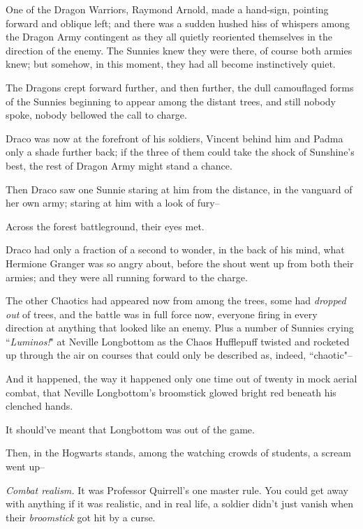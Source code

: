\later

One of the Dragon Warriors, Raymond Arnold, made a hand-sign, pointing forward and oblique left; and there was a sudden hushed hiss of whispers among the Dragon Army contingent as they all quietly reoriented themselves in the direction of the enemy. The Sunnies knew they were there, of course both armies knew; but somehow, in this moment, they had all become instinctively quiet.

The Dragons crept forward further, and then further, the dull camouflaged forms of the Sunnies beginning to appear among the distant trees, and still nobody spoke, nobody bellowed the call to charge.

Draco was now at the forefront of his soldiers, Vincent behind him and Padma only a shade further back; if the three of them could take the shock of Sunshine's best, the rest of Dragon Army might stand a chance.

Then Draco saw one Sunnie staring at him from the distance, in the vanguard of her own army; staring at him with a look of fury\---

Across the forest battleground, their eyes met.

Draco had only a fraction of a second to wonder, in the back of his mind, what Hermione Granger was so angry about, before the shout went up from both their armies; and they were all running forward to the charge.

\later

The other Chaotics had appeared now from among the trees, some had \emph{dropped out} of trees, and the battle was in full force now, everyone firing in every direction at anything that looked like an enemy. Plus a number of Sunnies crying ``\emph{Luminos!}" at Neville Longbottom as the Chaos Hufflepuff twisted and rocketed up through the air on courses that could only be described as, indeed, ``chaotic"\---

And it happened, the way it happened only one time out of twenty in mock aerial combat, that Neville Longbottom's broomstick glowed bright red beneath his clenched hands.

It should've meant that Longbottom was out of the game.

Then, in the Hogwarts stands, among the watching crowds of students, a scream went up\---

\emph{Combat realism.} It was Professor Quirrell's one master rule. You could get away with anything if it was realistic, and in real life, a soldier didn't just vanish when their \emph{broomstick} got hit by a curse.


